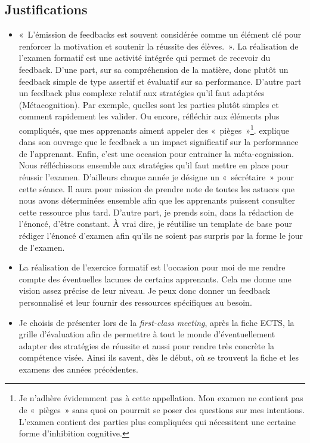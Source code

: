\subsection{Justifications}
\label{evaluation_des_apprentissages_justifications}
\begin{itemize}
    \item «~L’émission de feedbacks est souvent considérée comme un élément clé pour renforcer la motivation et soutenir la réussite des élèves.~»\cite{georges2011feedbacks}. La réalisation de l'examen formatif est une activité intégrée qui permet de recevoir du feedback. D'une part, sur sa compréhension de la matière, donc plutôt un feedback simple de type assertif et évaluatif\cite{georges2011feedbacks} sur sa performance. D'autre part un feedback plus complexe relatif aux stratégies qu'il faut adaptées (Métacognition). Par exemple, quelles sont les parties plutôt simples et comment rapidement les valider. Ou encore, réfléchir aux éléments plus compliqués, que mes apprenants aiment appeler des «~pièges~»\footnote{Je n'adhère évidemment pas à cette appellation. Mon examen ne contient pas de «~pièges~» sans quoi on pourrait se poser des questions sur mes intentions. L'examen contient des parties plus compliquées qui nécessitent une certaine forme d'inhibition cognitive.}. \citet{hattie2008visible} explique dans son ouvrage que le feedback a un impact significatif sur la performance de l'apprenant. Enfin, c'est une occasion pour entrainer la méta-cognission\cite{leclercq2008modele}. Nous réfléchissons ensemble aux stratégies qu'il faut mettre en place pour réussir l'examen. D'ailleurs chaque année je désigne un «~sécrétaire~» pour cette séance. Il aura pour mission de prendre note de toutes les astuces que nous avons déterminées ensemble afin que les apprenants puissent consulter cette ressource plus tard. D'autre part, je prends soin, dans la rédaction de l'énoncé, d'être constant. À vrai dire, je réutilise un template de base pour rédiger l'énoncé d’examen afin qu’ils ne soient pas surpris par la forme le jour de l'examen.
    \item La réalisation de l'exercice formatif est l'occasion pour moi de me rendre compte des éventuelles lacunes de certains apprenants. Cela me donne une vision assez précise de leur niveau. Je peux donc donner un feedback personnalisé et leur fournir des ressources spécifiques au besoin.
    \item Je choisis de présenter lors de la \textit{first-class meeting}, après la fiche ECTS, la grille d'évaluation afin de permettre à tout le monde d'éventuellement adapter des stratégies de réussite et aussi pour rendre très concrète la compétence visée. Ainsi ils savent, dès le début, où se trouvent la fiche et les examens des années précédentes.
\end{itemize}

